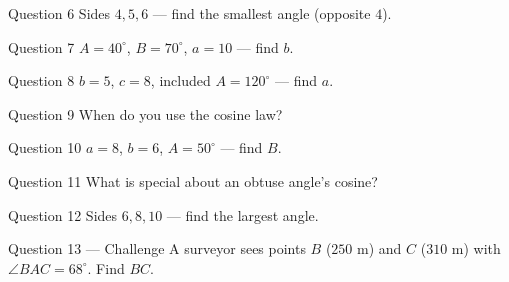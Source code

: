 \documentclass[11pt]{article}
\begin{document}
\begin{qbox}{Question 6}
Sides $4,5,6$ — find the smallest angle (opposite $4$).\workspace{2.4cm}
\end{qbox}

\begin{qbox}{Question 7}
$A=40^\circ$, $B=70^\circ$, $a=10$ — find $b$.\workspace{2.4cm}
\end{qbox}

\begin{qbox}{Question 8}
$b=5$, $c=8$, included $A=120^\circ$ — find $a$.\workspace{2.4cm}
\end{qbox}

\begin{qbox}{Question 9}
When do you use the cosine law?\workspace{2.4cm}
\end{qbox}

\begin{qbox}{Question 10}
$a=8$, $b=6$, $A=50^\circ$ — find $B$.\workspace{2.4cm}
\end{qbox}

\begin{qbox}{Question 11}
What is special about an obtuse angle's cosine?\workspace{2.4cm}
\end{qbox}

\begin{qbox}{Question 12}
Sides $6,8,10$ — find the largest angle.\workspace{2.4cm}
\end{qbox}

\begin{qbox}{Question 13 --- Challenge}
A surveyor sees points $B$ ($250$ m) and $C$ ($310$ m) with $\angle BAC=68^\circ$. Find $BC$.\workspace{3.2cm}
\end{qbox}

\clearpage
{}
\end{document}
